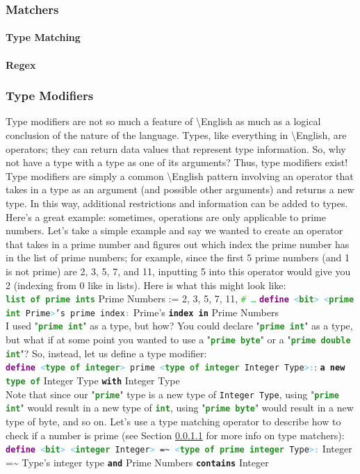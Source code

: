 \documentclass{article}
\newcommand{\English}{\textbackslash{}English}				%
\newcommand{\sssecl}[1]{\subsubsection{#1}\label{sssec:#1}}
\newcommand{\codecomment}[1]{\texttt{\textcolor{LimeGreen}{#1}}}
\newcommand{\commentline}[1]{\codecomment{\# #1}}
\newcommand{\type}[1]{\texttt{\textcolor{ForestGreen}{\textbf{#1}}}}
\newcommand{\keyop}[1]{\texttt{\textcolor{Purple}{\textbf{#1}}}}
\newcommand{\common}[1]{\texttt{\textcolor{Mulberry}{\textbf{#1}}}}
\newcommand{\defpunct}[1]{\texttt{\textcolor{SkyBlue}{\textbf{#1}}}}
\newcommand{\define}[2]{\texttt{\keyop{define} \defpunct{<}#1\defpunct{>} #2\defpunct{:}}}
\newenvironment{code}[0]
{\ttfamily{}				%
\setlength\parindent{0cm}	%
~\\}
{\setlength\parindent{1cm}
~\\}
\begin{document}
\sssecl{Matchers}


\paragraph{Type Matching} \label{par:Type Matching}

\paragraph{Regex} \label{par:Regex}

\sssecl{Type Modifiers}
\indent Type modifiers are not so much a feature of \English{} as much as a logical conclusion of the nature of the language. Types, like everything in \English{}, are operators; they can return data values that represent type information. So, why not have a type with a type as one of its arguments? Thus, type modifiers exist!
\indent Type modifiers are simply a common \English{} pattern involving an operator that takes in a type as an argument (and possible other arguments) and returns a new type. In this way, additional restrictions and information can be added to types.
\indent Here's a great example: sometimes, operations are only applicable to prime numbers. Let's take a simple example and say we wanted to create an operator that takes in a prime number and figures out which index the prime number has in the list of prime numbers; for example, since the first 5 prime numbers (and 1 is not prime) are 2, 3, 5, 7, and 11, inputting 5 into this operator would give you 2 (indexing from 0 like in lists). Here is what this might look like:
\begin{code}
\type{list of prime ints} Prime Numbers := 2, 3, 5, 7, 11, \commentline{\ldots}
\define{\type{bit}}{\defpunct{<}\type{prime int} Prime\defpunct{>}'s prime index}
\qquad{}Prime's \common{index in} Prime Numbers
\end{code}
\indent I used "\type{prime int}" as a type, but how? You could declare "\type{prime int}" as a type, but what if at some point you wanted to use a "\type{prime byte}" or a "\type{prime double int}"? So, instead, let us define a type modifier:
\begin{code}
\define{\type{type of integer}}{prime \defpunct{<}\type{type of integer} Integer Type\defpunct{>}}:
\qquad{}\common{a new} \type{type of} Integer Type \common{with} Integer Type
\end{code}
\indent Note that since our "\type{prime}" type is a new type of \texttt{Integer Type}, using "\type{prime int}" would result in a new type of \type{int}, using "\type{prime byte}" would result in a new type of byte, and so on. Let's use a type matching operator to describe how to check if a number is prime (see Section \ref{par:Type Matching} for more info on type matchers):
\begin{code}
\define{\type{bit}}{\defpunct{<}\type{integer} Integer\defpunct{>} =\textasciitilde{} \defpunct{<}\type{type of prime integer} Type\defpunct{>}}
\qquad{}Integer =\textasciitilde{} Type's integer type \common{and} Prime Numbers \common{contains} Integer
\end{code}
\end{document}
